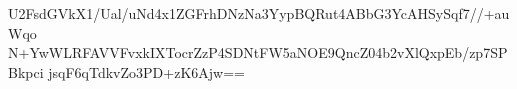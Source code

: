 U2FsdGVkX1/Ual/uNd4x1ZGFrhDNzNa3YypBQRut4ABbG3YcAHSySqf7//+auWqo
N+YwWLRFAVVFvxkIXTocrZzP4SDNtFW5aNOE9QncZ04b2vXlQxpEb/zp7SPBkpci
jsqF6qTdkvZo3PD+zK6Ajw==

